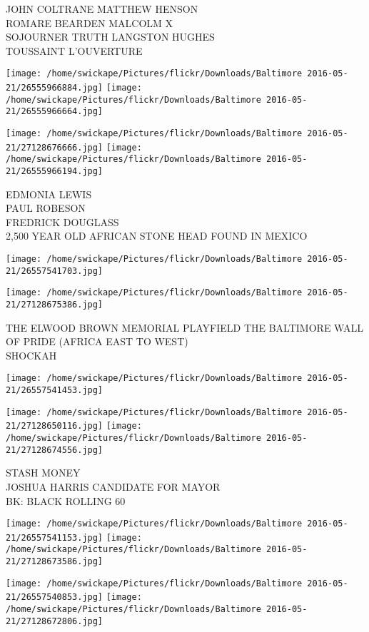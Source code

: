 \documentclass[10pt,letterpaper]{article}
\begin{document}
JOHN COLTRANE MATTHEW HENSON\\
ROMARE BEARDEN MALCOLM X\\
SOJOURNER TRUTH LANGSTON HUGHES\\
TOUSSAINT L'OUVERTURE
\pagebreak

\texttt{[image: /home/swickape/Pictures/flickr/Downloads/Baltimore 2016-05-21/26555966884.jpg]}
\texttt{[image: /home/swickape/Pictures/flickr/Downloads/Baltimore 2016-05-21/26555966664.jpg]}

\texttt{[image: /home/swickape/Pictures/flickr/Downloads/Baltimore 2016-05-21/27128676666.jpg]}
\texttt{[image: /home/swickape/Pictures/flickr/Downloads/Baltimore 2016-05-21/26555966194.jpg]}

EDMONIA LEWIS\\
PAUL ROBESON\\
FREDRICK DOUGLASS\\
2,500 YEAR OLD AFRICAN STONE HEAD FOUND IN MEXICO
\pagebreak

\texttt{[image: /home/swickape/Pictures/flickr/Downloads/Baltimore 2016-05-21/26557541703.jpg]}

\vspace{0.25in}
\texttt{[image: /home/swickape/Pictures/flickr/Downloads/Baltimore 2016-05-21/27128675386.jpg]}

THE ELWOOD BROWN MEMORIAL PLAYFIELD THE BALTIMORE WALL OF PRIDE (AFRICA EAST TO WEST)\\
SHOCKAH
\pagebreak

\texttt{[image: /home/swickape/Pictures/flickr/Downloads/Baltimore 2016-05-21/26557541453.jpg]}

\vspace{0.25in}
\texttt{[image: /home/swickape/Pictures/flickr/Downloads/Baltimore 2016-05-21/27128650116.jpg]}
\texttt{[image: /home/swickape/Pictures/flickr/Downloads/Baltimore 2016-05-21/27128674556.jpg]}

STASH MONEY\\
JOSHUA HARRIS CANDIDATE FOR MAYOR\\
BK: BLACK ROLLING 60
\pagebreak

\texttt{[image: /home/swickape/Pictures/flickr/Downloads/Baltimore 2016-05-21/26557541153.jpg]}
\texttt{[image: /home/swickape/Pictures/flickr/Downloads/Baltimore 2016-05-21/27128673586.jpg]}

\texttt{[image: /home/swickape/Pictures/flickr/Downloads/Baltimore 2016-05-21/26557540853.jpg]}
\texttt{[image: /home/swickape/Pictures/flickr/Downloads/Baltimore 2016-05-21/27128672806.jpg]}
\end{document}
